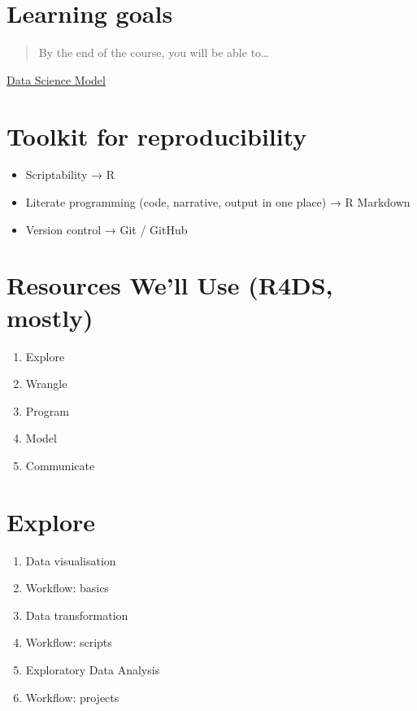 \documentclass[
]{book}
\providecommand{\tightlist}{%
  \setlength{\itemsep}{0pt}\setlength{\parskip}{0pt}}
\theoremstyle{definition}
\theoremstyle{definition}
\theoremstyle{definition}
\theoremstyle{definition}
\theoremstyle{remark}
\begin{document}
\hypertarget{learning-goals}{%
\section{Learning goals}\label{learning-goals}}

\begin{quote}
By the end of the course, you will be able to\ldots{}
\end{quote}

\href{https://d33wubrfki0l68.cloudfront.net/571b056757d68e6df81a3e3853f54d3c76ad6efc/32d37/diagrams/data-science.png}{Data Science Model}

\hypertarget{toolkit-for-reproducibility}{%
\section{Toolkit for reproducibility}\label{toolkit-for-reproducibility}}

\begin{itemize}
\tightlist
\item
  Scriptability → R
\item
  Literate programming (code, narrative, output in one place) → R Markdown
\item
  Version control → Git / GitHub
\end{itemize}

\hypertarget{resources-well-use-r4ds-mostly}{%
\section{Resources We'll Use (R4DS, mostly)}\label{resources-well-use-r4ds-mostly}}

\begin{enumerate}
\def\labelenumi{\arabic{enumi})}
\tightlist
\item
  Explore
\item
  Wrangle
\item
  Program
\item
  Model
\item
  Communicate
\end{enumerate}

\hypertarget{explore}{%
\section{Explore}\label{explore}}

\begin{enumerate}
\def\labelenumi{\arabic{enumi})}
\setcounter{enumi}{2}
\tightlist
\item
  Data visualisation
\item
  Workflow: basics
\item
  Data transformation
\item
  Workflow: scripts
\item
  Exploratory Data Analysis
\item
  Workflow: projects
\end{enumerate}
\end{document}
